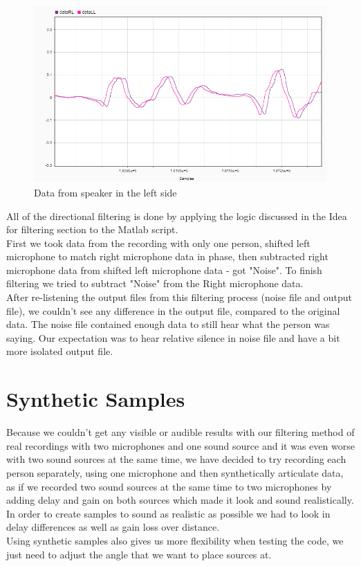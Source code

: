  
\begin{figure}[htp]
  \centering
  \includegraphics[width=0.75\linewidth]{Illustrations/DataL.png}
  \caption{Data from speaker in the left side}
  \label{fig:L}
\end{figure}

 

All of the directional filtering is done by applying the logic discussed in the Idea for filtering section to 
the Matlab script.\\
First we took data from the recording with only one person, shifted left microphone to match right microphone 
data in phase, then subtracted right microphone data from shifted left microphone data - got "Noise". To 
finish filtering we tried to subtract "Noise" from the Right microphone data.\\
After re-listening the output files from this filtering process (noise file and output file), we couldn't see 
any difference in the output file, compared to the original data. The noise file contained enough data to 
still hear what the person was saying. Our expectation was to hear relative silence in noise file and have a 
bit more isolated output file.


\section{Synthetic Samples}
  Because we couldn't get any visible or audible results with our filtering method of real recordings with two 
microphones and one sound source and it was even worse with two sound sources at the same time, we have 
decided to try recording each person separately, using one microphone and then synthetically articulate data, 
as if we recorded two sound sources at the same time to two microphones by adding delay and gain on both 
sources which made it look and sound realistically.\\
  In order to create samples to sound as realistic as possible we had to look in delay differences as well as 
gain loss over distance. \\
Using synthetic samples also gives us more flexibility when testing the code, we just need to adjust the 
angle that we want to place sources at. 
